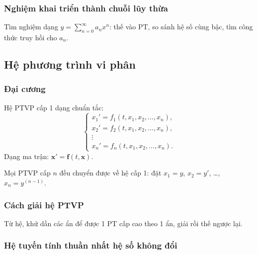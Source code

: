 \documentclass[12pt,a4paper]{article}
\begin{document}
\subsubsection{Nghiệm khai triển thành chuỗi lũy thừa}

\begin{phuongphap}
  Tìm nghiệm dạng $y = \displaystyle\sum_{n=0}^{\infty} a_n x^n$: thế vào PT, so sánh hệ số cùng bậc, tìm công thức truy hồi cho $a_n$.
\end{phuongphap}

\subsection{Hệ phương trình vi phân}

\subsubsection{Đại cương}

\begin{dinhnghia}
  Hệ PTVP cấp 1 dạng chuẩn tắc:
  \[
    \begin{cases}
      x_1' = f_1(t, x_1, x_2, \ldots, x_n), \\
      x_2' = f_2(t, x_1, x_2, \ldots, x_n), \\
      \vdots \\
      x_n' = f_n(t, x_1, x_2, \ldots, x_n).
    \end{cases}
  \]
  Dạng ma trận: $\mathbf{x}' = \mathbf{f}(t, \mathbf{x})$.
\end{dinhnghia}

\begin{luuy}
  Mọi PTVP cấp $n$ đều chuyển được về hệ cấp 1: đặt $x_1 = y$, $x_2 = y'$, \ldots, $x_n = y^{(n-1)}$.
\end{luuy}

\subsubsection{Cách giải hệ PTVP}

\begin{phuongphap}[title={Phương pháp khử}]
  Từ hệ, khử dần các ẩn để được 1 PT cấp cao theo 1 ẩn, giải rồi thế ngược lại.
\end{phuongphap}

\subsubsection{Hệ tuyến tính thuần nhất hệ số không đổi}
\end{document}
